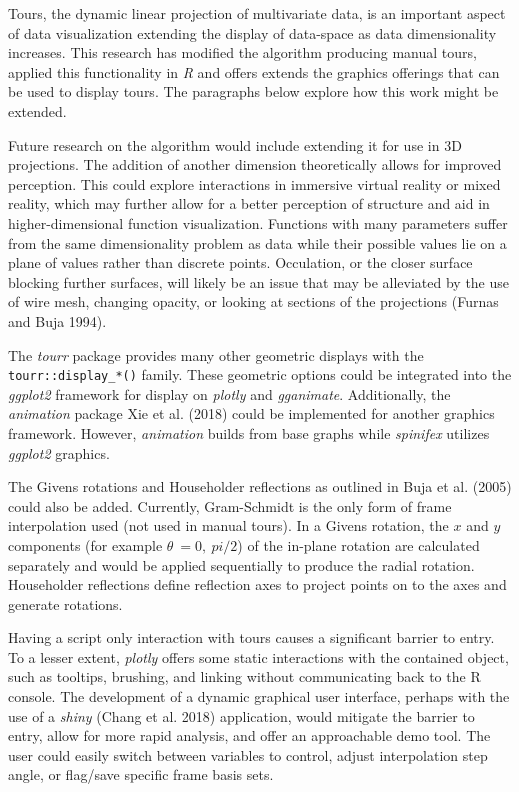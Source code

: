 Tours, the dynamic linear projection of multivariate data, is an important aspect of data visualization extending the display of data-space as data dimensionality increases. This research has modified the algorithm producing manual tours, applied this functionality in \emph{R} and offers extends the graphics offerings that can be used to display tours. The paragraphs below explore how this work might be extended.

Future research on the algorithm would include extending it for use in 3D projections. The addition of another dimension theoretically allows for improved perception. This could explore interactions in immersive virtual reality or mixed reality, which may further allow for a better perception of structure and aid in higher-dimensional function visualization. Functions with many parameters suffer from the same dimensionality problem as data while their possible values lie on a plane of values rather than discrete points. Occulation, or the closer surface blocking further surfaces, will likely be an issue that may be alleviated by the use of wire mesh, changing opacity, or looking at sections of the projections (Furnas and Buja 1994).

The \emph{tourr} package provides many other geometric displays with the \texttt{tourr::display\_*()} family. These geometric options could be integrated into the \emph{ggplot2} framework for display on \emph{plotly} and \emph{gganimate}. Additionally, the \emph{animation} package Xie et al. (2018) could be implemented for another graphics framework. However, \emph{animation} builds from base graphs while \emph{spinifex} utilizes \emph{ggplot2} graphics.

The Givens rotations and Householder reflections as outlined in Buja et al. (2005) could also be added. Currently, Gram-Schmidt is the only form of frame interpolation used (not used in manual tours). In a Givens rotation, the \(x\) and \(y\) components (for example \(\theta~= 0,~pi/2\)) of the in-plane rotation are calculated separately and would be applied sequentially to produce the radial rotation. Householder reflections define reflection axes to project points on to the axes and generate rotations.

Having a script only interaction with tours causes a significant barrier to entry. To a lesser extent, \emph{plotly} offers some static interactions with the contained object, such as tooltips, brushing, and linking without communicating back to the R console. The development of a dynamic graphical user interface, perhaps with the use of a \emph{shiny} (Chang et al. 2018) application, would mitigate the barrier to entry, allow for more rapid analysis, and offer an approachable demo tool. The user could easily switch between variables to control, adjust interpolation step angle, or flag/save specific frame basis sets.

